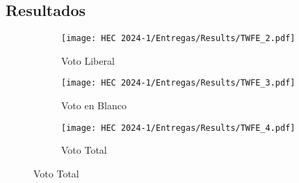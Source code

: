\documentclass[a4paper]{article}
\begin{document}
\subsection{Resultados}
\begin{figure}[H]
    \centering
    \caption{Efecto de la Violencia sobre Otros Patrones de Votos}
    \begin{subfigure}[b]{0.45\linewidth}
        \texttt{[image: HEC 2024-1/Entregas/Results/TWFE\_2.pdf]}
        \caption{Voto Liberal}
        \label{fig:sub1}
    \end{subfigure}
    \hfill %
    \begin{subfigure}[b]{0.45\linewidth}
        \texttt{[image: HEC 2024-1/Entregas/Results/TWFE\_3.pdf]}
        \caption{Voto en Blanco}
        \label{fig:sub2}
    \end{subfigure}
    
    \begin{subfigure}[b]{0.6\linewidth} %
        \centering
        \texttt{[image: HEC 2024-1/Entregas/Results/TWFE\_4.pdf]}
        \caption{Voto Total}
        \label{fig:sub3}
    \end{subfigure}
    \label{fig:robustness1}
\end{figure}
\end{document}
